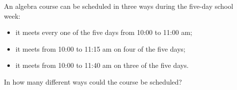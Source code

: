 An algebra course can be scheduled in three ways during the five-day school week:
\begin{itemize}
\item it meets every one of the five days from 10:00 to 11:00 am;
\item it meets from 10:00 to 11:15 am on four of the five days;
\item it meets from 10:00 to 11:40 am on three of the five days.
\end{itemize}
In how many different ways could the course be scheduled?
